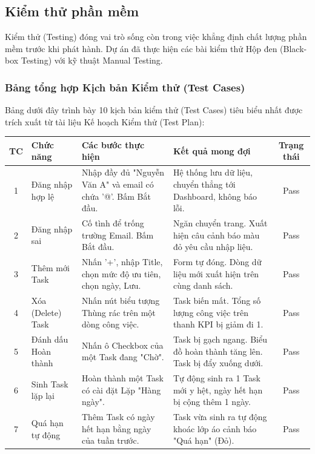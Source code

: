 \subsection{Kiểm thử phần mềm}

Kiểm thử (Testing) đóng vai trò sống còn trong việc khẳng định chất lượng phần mềm trước khi phát hành. Dự án đã thực hiện các bài kiểm thử Hộp đen (Black-box Testing) với kỹ thuật Manual Testing.

\subsubsection{Bảng tổng hợp Kịch bản Kiểm thử (Test Cases)}
Bảng dưới đây trình bày 10 kịch bản kiểm thử (Test Cases) tiêu biểu nhất được trích xuất từ tài liệu Kế hoạch Kiểm thử (Test Plan):

\begin{table}[H]
    \centering
    \renewcommand{\arraystretch}{1.5}
    \begin{tabular}{|c|p{3.0cm}|p{4.5cm}|p{4.5cm}|c|}
        \hline
        \textbf{TC} & \textbf{Chức năng} & \textbf{Các bước thực hiện} & \textbf{Kết quả mong đợi} & \textbf{Trạng thái} \\
        \hline
        1 & Đăng nhập hợp lệ & Nhập đầy đủ "Nguyễn Văn A" và email có chứa '@'. Bấm Bắt đầu. & Hệ thống lưu dữ liệu, chuyển thẳng tới Dashboard, không báo lỗi. & Pass \\
        \hline
        2 & Đăng nhập sai & Cố tình để trống trường Email. Bấm Bắt đầu. & Ngăn chuyển trang. Xuất hiện câu cảnh báo màu đỏ yêu cầu nhập liệu. & Pass \\
        \hline
        3 & Thêm mới Task & Nhấn '+', nhập Title, chọn mức độ ưu tiên, chọn ngày, Lưu. & Form tự đóng. Dòng dữ liệu mới xuất hiện trên cùng danh sách. & Pass \\
        \hline
        4 & Xóa (Delete) Task & Nhấn nút biểu tượng Thùng rác trên một dòng công việc. & Task biến mất. Tổng số lượng công việc trên thanh KPI bị giảm đi 1. & Pass \\
        \hline
        5 & Đánh dấu Hoàn thành & Nhấn ô Checkbox của một Task đang "Chờ". & Task bị gạch ngang. Biểu đồ hoàn thành tăng lên. Task bị đẩy xuống dưới. & Pass \\
        \hline
        6 & Sinh Task lặp lại & Hoàn thành một Task có cài đặt Lặp "Hàng ngày". & Tự động sinh ra 1 Task mới y hệt, ngày hết hạn bị cộng thêm 1 ngày. & Pass \\
        \hline
        7 & Quá hạn tự động & Thêm Task có ngày hết hạn bằng ngày của tuần trước. & Task vừa sinh ra tự động khoác lớp áo cảnh báo "Quá hạn" (Đỏ). & Pass \\

\end{tabular}
\end{table}
